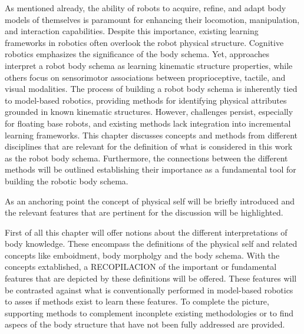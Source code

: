 
As mentioned already, the ability of robots to acquire, refine, and adapt body models of themselves is paramount for enhancing their locomotion, manipulation, and interaction capabilities. Despite this importance, existing learning frameworks in robotics often overlook the robot physical structure. Cognitive robotics emphasizes the significance of the body schema. Yet, approaches interpret a robot body schema as learning kinematic structure properties, while others focus on sensorimotor associations between proprioceptive, tactile, and visual modalities. The process of building a robot body schema is inherently tied to model-based robotics, providing methods for identifying physical attributes grounded in known kinematic structures. However, challenges persist, especially for floating base robots, and existing methods lack integration into incremental learning frameworks. This chapter discusses concepts and methods from different disciplines that are relevant for the definition of what is considered in this work as the robot body schema. Furthermore, the connections between the different methods will be outlined establishing their importance as a fundamental tool for building the robotic body schema. 


As an anchoring point the concept of physical self will be briefly introduced and the relevant features that are pertinent for the discussion will be highlighted. 

First of all this chapter will offer notions about the different interpretations of body knowledge. These encompass the definitions of the physical self and related concepts like emboidment, body morpholgy and the body schema. With the concepts extablished, a RECOPILACION of the important or fundamental features that are depicted by these definitions will be offered. These features will be contrasted against what is conventionally performed in model-based robotics to asses if methods exist to learn these features. To complete the picture, supporting methods to complement inconplete existing methodologies or to find aspecs of the body structure that have not been fully addressed are provided. %


